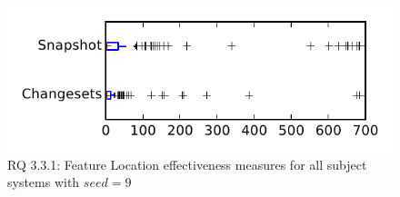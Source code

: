 
\begin{figure}
\centering
\includegraphics[height=0.4\textheight]{figures/flt_seed/rq1_tiny_9}
\caption{RQ 3.3.1: Feature Location effectiveness measures for all subject systems with $seed=9$}
\label{fig:flt_seed:rq1:tiny}
\end{figure}
